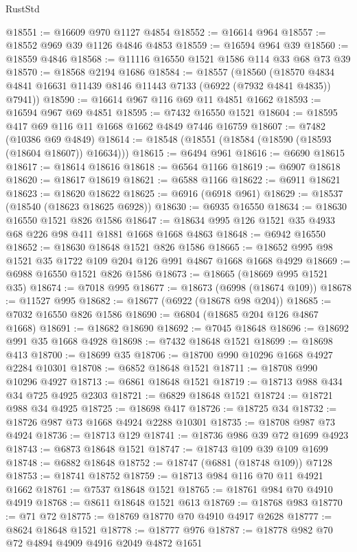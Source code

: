 \begin{lexlean}{RustStd}
\begin{coremodule}
@18551 := @16609 @970 @1127 @4854
@18552 := @16614 @964
@18557 := @18552 @969 @39 @1126 @4846 @4853
@18559 := @16594 @964 @39
@18560 := @18559 @4846
@18568 := @11116 @16550 @1521 @1586 @114 @33 @68 @73 @39
@18570 := @18568 @2194 @1686
@18584 := @18557
    (@18560 (@18570 @4834 @4841 @16631 @11439 @8146 @11443 @7133 (@6922 (@7932 @4841 @4835)) @7941))
@18590 := @16614 @967 @116 @69 @11 @4851 @1662
@18593 := @16594 @967 @69 @4851
@18595 := @7432 @16550 @1521
@18604 := @18595 @417 @69 @116 @11 @1668 @1662 @4849 @7446 @16759
@18607 := @7482 (@10386 @69 @4849)
@18614 := @18548 (@18551 (@18584 (@18590 (@18593 (@18604 @18607)) @16634)))
@18615 := @6494 @961
@18616 := @6690 @18615
@18617 := @18614 @18616
@18618 := @6564 @1166
@18619 := @6907 @18618
@18620 := @18617 @18619
@18621 := @6588 @1166
@18622 := @6911 @18621
@18623 := @18620 @18622
@18625 := @6916 (@6918 @961)
@18629 := @18537 (@18540 (@18623 @18625 @6928))
@18630 := @6935 @16550
@18634 := @18630 @16550 @1521 @826 @1586
@18647 := @18634 @995 @126 @1521 @35 @4933 @68 @226 @98 @411 @1881 @1668 @1668 @4863
@18648 := @6942 @16550
@18652 := @18630 @18648 @1521 @826 @1586
@18665 := @18652 @995 @98 @1521 @35 @1722 @109 @204 @126 @991 @4867 @1668 @1668 @4929
@18669 := @6988 @16550 @1521 @826 @1586
@18673 := @18665 (@18669 @995 @1521 @35)
@18674 := @7018 @995
@18677 := @18673 (@6998 (@18674 @109))
@18678 := @11527 @995
@18682 := @18677 (@6922 (@18678 @98 @204))
@18685 := @7032 @16550 @826 @1586
@18690 := @6804 (@18685 @204 @126 @4867 @1668)
@18691 := @18682 @18690
@18692 := @7045 @18648
@18696 := @18692 @991 @35 @1668 @4928
@18698 := @7432 @18648 @1521
@18699 := @18698 @413
@18700 := @18699 @35
@18706 := @18700 @990 @10296 @1668 @4927 @2284 @10301
@18708 := @6852 @18648 @1521
@18711 := @18708 @990 @10296 @4927
@18713 := @6861 @18648 @1521
@18719 := @18713 @988 @434 @34 @725 @4925 @2303
@18721 := @6829 @18648 @1521
@18724 := @18721 @988 @34 @4925
@18725 := @18698 @417
@18726 := @18725 @34
@18732 := @18726 @987 @73 @1668 @4924 @2288 @10301
@18735 := @18708 @987 @73 @4924
@18736 := @18713 @129
@18741 := @18736 @986 @39 @72 @1699 @4923
@18743 := @6873 @18648 @1521
@18747 := @18743 @109 @39 @109 @1699
@18748 := @6882 @18648
@18752 := @18747 (@6881 (@18748 @109)) @7128
@18753 := @18741 @18752
@18759 := @18713 @984 @116 @70 @11 @4921 @1662
@18761 := @7537 @18648 @1521
@18765 := @18761 @984 @70 @4910 @4919
@18768 := @8611 @18648 @1521 @613
@18769 := @18768 @983
@18770 := @71 @72
@18775 := @18769 @18770 @70 @4910 @4917 @2628
@18777 := @8624 @18648 @1521
@18778 := @18777 @976
@18787 := @18778 @982 @70 @72 @4894 @4909 @4916 @2049 @4872 @1651

\end{coremodule}
\end{lexlean}
